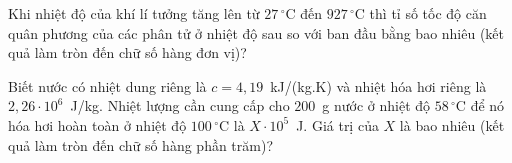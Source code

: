 \begin{ex}
\begin{minipage}[c]{0.32\linewidth}
\begin{tikzpicture}[x=0.004cm,y=-0.004cm,line join=round,line cap=round,font=\footnotesize]
			\end{tikzpicture}
		\end{minipage}
		\par
	\end{ex}

	\begin{ex}%
		Khi nhiệt độ của khí lí tưởng tăng lên từ $27\,^\circ\text{C}$ đến $927\,^\circ\text{C}$ thì tỉ số tốc độ căn quân phương của các phân tử ở nhiệt độ sau so với ban đầu bằng bao nhiêu (kết quả làm tròn đến chữ số hàng đơn vị)?
		\par
	\end{ex}

	\begin{ex}%
		Biết nước có nhiệt dung riêng là $c=4{,}19$~kJ/(kg.K) và nhiệt hóa hơi riêng là $2{,}26\cdot 10^6$~J/kg. Nhiệt lượng cần cung cấp cho $200$~g nước ở nhiệt độ $58\,^\circ\text{C}$ để nó hóa hơi hoàn toàn ở nhiệt độ $100\,^\circ\text{C}$ là $X\cdot 10^5$~J. Giá trị của $X$ là bao nhiêu (kết quả làm tròn đến chữ số hàng phần trăm)?
		\par
	\end{ex}

